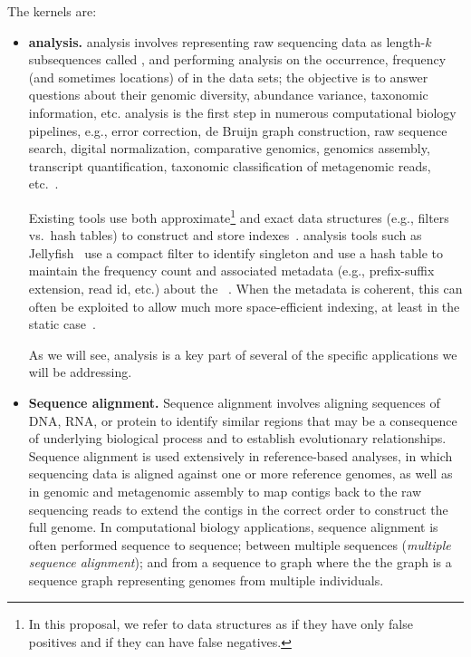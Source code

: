 The kernels are:


\begin{itemize}[leftmargin=*,noitemsep,nolistsep]
\item \textbf{\Kmer analysis.}
\Kmer analysis involves representing raw sequencing data as length-$k$ subsequences called , and performing analysis on the occurrence, frequency (and sometimes locations) of \kmers in the data sets; the objective is to answer questions about their genomic diversity, abundance variance, taxonomic information, etc. \Kmer analysis is the first step in numerous computational biology pipelines, e.g., error correction, de Bruijn graph construction, raw sequence search, digital normalization, comparative genomics, genomics assembly, transcript quantification, taxonomic classification of metagenomic reads, etc.~\cite{wood2014kraken,GeorganasEHG18,hofmeyr2020terabase,solomon2016fast,PatroSailfish:2014,PandeyABFJP18Cell,PandeyBJP17a,PandeyBJP17b}.

Existing tools use both  approximate\footnote{In this proposal, we refer to data structures as  if they  have only false positives and  if they can have false negatives.} and exact data structures (e.g., filters vs.\ hash tables) to construct and store \kmer indexes~\cite{MarccaisKi11,PandeyBJP17a}.  \Kmer analysis tools such as  Jellyfish~\cite{MarccaisKi11} use a compact filter to identify singleton \kmers and use a hash table to maintain the frequency count and associated metadata (e.g., prefix-suffix extension, read id, etc.) about the \kmers~\cite{hofmeyr2020terabase}. When the metadata is coherent, this can often be exploited to allow much more space-efficient indexing, at least in the static case~\cite{pibiri2022sparse,pibiri2023weighted,fan2023spt,fan2023fulgor}.

As we will see, \kmer analysis is a key part of several of the specific applications we will be addressing. 


\item \textbf{Sequence alignment.} Sequence alignment involves aligning sequences of DNA, RNA, or protein to identify similar regions that may be a consequence of underlying biological process and to establish evolutionary relationships.
Sequence alignment is used extensively in reference-based analyses, in which sequencing data is aligned against one or more reference genomes, as well as in genomic and metagenomic assembly to map contigs back to the raw sequencing reads to extend the contigs in the correct order to construct the full genome. In computational biology applications, sequence alignment is often performed sequence to sequence; between multiple sequences (\emph{multiple sequence alignment}); and from a sequence to graph where the the graph is a sequence graph representing genomes from multiple individuals.


\end{itemize}
